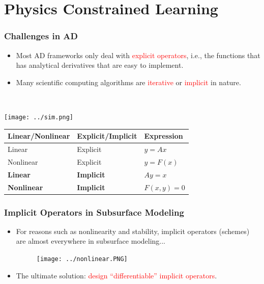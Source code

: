 \documentclass[usenames,dvipsnames]{beamer}
\begin{document}
\section{Physics Constrained Learning}
\begin{frame}


	\frametitle{Challenges in AD}
	
	
	\begin{minipage}[t]{0.49\textwidth}
	\vspace{-3cm}
\begin{itemize}
	\item Most AD frameworks only deal with \textcolor{red}{explicit operators}, i.e., the functions that has analytical derivatives that are easy to implement.  
	\item Many scientific computing algorithms are \textcolor{red}{iterative} or \textcolor{red}{implicit} in nature.
\end{itemize}
\end{minipage}~
\begin{minipage}[t]{0.49\textwidth}
  \texttt{[image: ../sim.png]}
\end{minipage}

\begin{table}[]
\begin{tabular}{@{}lll@{}}
\toprule
Linear/Nonlinear & Explicit/Implicit & Expression   \\ \midrule
Linear           & Explicit          & $y=Ax$       \\
Nonlinear        & Explicit          & $y = F(x)$   \\
\textbf{Linear}           & \textbf{Implicit}          & $Ay = x$     \\
\textbf{Nonlinear}        & \textbf{Implicit}          & $F(x,y) = 0$ \\ \bottomrule
\end{tabular}
\end{table}
\end{frame}



\begin{frame}
	\frametitle{Implicit Operators in Subsurface Modeling}
		
		\begin{itemize}
			\item For reasons such as nonlinearity and stability, implicit operators (schemes) are almost everywhere in subsurface modeling...
				\begin{figure}
				\centering
				\texttt{[image: ../nonlinear.PNG]}
			\end{figure}
			\item The ultimate solution: \textcolor{red}{design ``differentiable'' implicit operators}.
		\end{itemize}
		
\end{frame}
\end{document}
